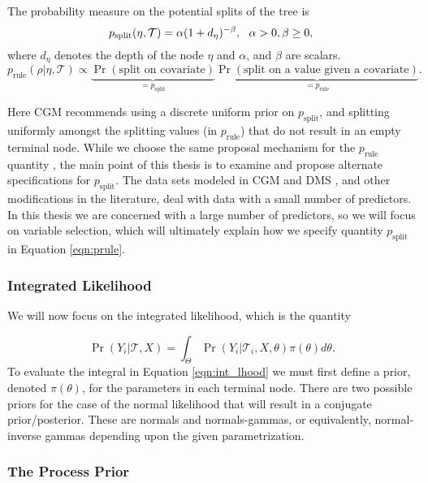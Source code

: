 The probability measure on the potential splits of the tree is
\begin{equation}\label{eqn:psplit}
p_{\text{split}}(\eta, \mathcal{T})=\alpha(1+d_{\eta})^{-\beta}, \ \ \alpha>0, \beta\geq 0,\\
\end{equation}
where $d_{\eta}$ denotes the depth of the node $\eta$ and $\alpha$, and $\beta$ are scalars. 
\begin{equation}\label{eqn:prule}
p_{\text{rule}}(\rho \vert \eta, \mathcal{T}) \propto \underbrace{\Pr(\text{split on covariate})}_{=p_{\text{split}}}\underbrace{\Pr(\text{split on a value given a covariate})}_{=p_{\text{rule}}}. 
\end{equation}

Here CGM recommends using a discrete uniform prior on $p_{\text{split}}$, and splitting uniformly amongst the splitting values (in $p_{\text{rule}}$) that do not result in an empty terminal node. While we choose the same proposal mechanism for the $p_{\text{rule}}$ quantity , the main point of this thesis is to examine and propose alternate specifications for $p_{\text{split}}$. The data sets modeled in CGM \cite{chipman1998bayesian} and DMS \cite{denison1998bayesian}, and other modifications in the literature, deal with data with a small number of predictors. In this thesis we are concerned with a large number of predictors, so we will focus on variable selection, which will ultimately explain how we specify quantity $p_{\text{split}}$ in Equation \ref{eqn:prule}. 

\subsubsection{Integrated Likelihood}
We will now focus on the integrated likelihood, which is the quantity 

\begin{equation}\label{eqn:int_lhood}
\Pr(Y_i \vert \mathcal{T}, X) = \int_{\Theta}\Pr(Y_i \vert \mathcal{T}_i, X, \theta)\pi(\theta)d\theta.
\end{equation}
To evaluate the integral in Equation \ref{eqn:int_lhood} we must first define a prior, denoted $\pi(\theta)$, for the parameters in each terminal node. 
There are two possible priors for the case of the normal likelihood that will result in a conjugate prior/posterior. These are normals and normals-gammas, or equivalently, normal-inverse gammas depending upon the given parametrization. 

\subsubsection{The Process Prior}

